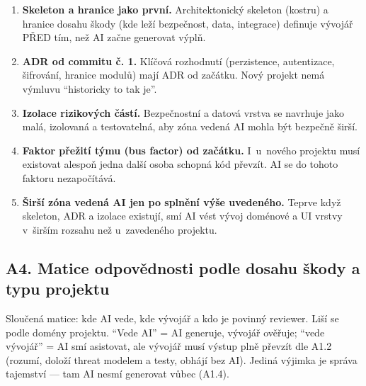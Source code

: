 \begin{enumerate}[label=\textbf{A3.\arabic*}]
\item \textbf{Skeleton a hranice jako první.}
Architektonický skeleton (kostru) a hranice dosahu škody (kde leží bezpečnost, data, integrace) definuje vývojář PŘED tím, než AI začne generovat výplň.
\item \textbf{ADR od commitu č. 1.}
Klíčová rozhodnutí (perzistence, autentizace, šifrování, hranice modulů) mají ADR od začátku.
Nový projekt nemá výmluvu \enquote{historicky to tak je}.
\item \textbf{Izolace rizikových částí.}
Bezpečnostní a datová vrstva se navrhuje jako malá, izolovaná a testovatelná, aby zóna vedená AI mohla být bezpečně širší.
\item \textbf{Faktor přežití týmu (bus factor) od začátku.}
I~u~nového projektu musí existovat alespoň jedna další osoba schopná kód převzít.
AI se do tohoto faktoru nezapočítává.
\item \textbf{Širší zóna vedená AI jen po splnění výše uvedeného.}
Teprve když skeleton, ADR a izolace existují, smí AI vést vývoj doménové a UI vrstvy v~širším rozsahu než u~zavedeného projektu.
\end{enumerate}

\subsection{A4. Matice odpovědnosti podle dosahu škody a typu projektu}

Sloučená matice: kde AI vede, kde vývojář a kdo je povinný reviewer.
Liší se podle domény projektu.
\enquote{Vede AI} = AI generuje, vývojář ověřuje; \enquote{vede vývojář} = AI smí asistovat, ale vývojář musí výstup plně převzít dle A1.2 (rozumí, doloží threat modelem a testy, obhájí bez AI).
Jediná výjimka je správa tajemství --- tam AI nesmí generovat vůbec (A1.4).

